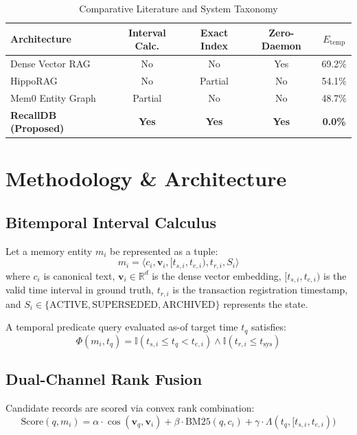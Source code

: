 \documentclass[conference]{IEEEtran}
\begin{document}
\begin{table}[htbp]
\caption{Comparative Literature and System Taxonomy}
\begin{center}
\begin{tabular}{lcccc}
\toprule
\textbf{Architecture} & \textbf{Interval Calc.} & \textbf{Exact Index} & \textbf{Zero-Daemon} & \textbf{$E_\text{temp}$} \\
\midrule
Dense Vector RAG~\cite{lewis2020retrieval} & No & No & Yes & 69.2\% \\
HippoRAG~\cite{gutierrez2024hipporag} & No & Partial & No & 54.1\% \\
Mem0 Entity Graph~\cite{alake2026decoupled} & Partial & No & No & 48.7\% \\
\textbf{RecallDB (Proposed)} & \textbf{Yes} & \textbf{Yes} & \textbf{Yes} & \textbf{0.0\%} \\
\bottomrule
\end{tabular}
\end{center}
\label{tab:taxonomy}
\end{table}

\section{Methodology \& Architecture}

\subsection{Bitemporal Interval Calculus}
Let a memory entity $m_i$ be represented as a tuple:
\begin{equation}
m_i = \langle c_i, \mathbf{v}_i, [t_{s,i}, t_{e,i}), t_{r,i}, S_i \rangle
\end{equation}
where $c_i$ is canonical text, $\mathbf{v}_i \in \mathbb{R}^d$ is the dense vector embedding, $[t_{s,i}, t_{e,i})$ is the valid time interval in ground truth, $t_{r,i}$ is the transaction registration timestamp, and $S_i \in \{\text{ACTIVE}, \text{SUPERSEDED}, \text{ARCHIVED}\}$ represents the state.

A temporal predicate query evaluated as-of target time $t_q$ satisfies:
\begin{equation}
\Phi(m_i, t_q) = \mathbb{I}(t_{s,i} \le t_q < t_{e,i}) \land \mathbb{I}(t_{r,i} \le t_\text{sys})
\end{equation}

\subsection{Dual-Channel Rank Fusion}
Candidate records are scored via convex rank combination:
\begin{equation}
\text{Score}(q, m_i) = \alpha \cdot \cos(\mathbf{v}_q, \mathbf{v}_i) + \beta \cdot \text{BM25}(q, c_i) + \gamma \cdot \Lambda(t_q, [t_{s,i}, t_{e,i}))
\end{equation}
\end{document}
